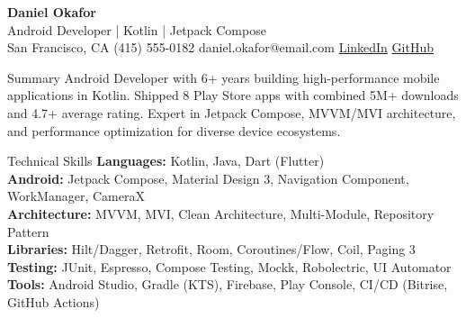 \documentclass[9.5pt,a4paper]{article}
\begin{document}
\begin{tcolorbox}[colback=accent,colframe=accent,arc=4pt,left=8pt,right=8pt,top=6pt,bottom=6pt]
{\color{white}\fontsize{18}{22}\selectfont\bfseries Daniel Okafor}\\[3pt]
{\color{white}\small Android Developer | Kotlin | Jetpack Compose}\\[3pt]
{\color{white}\small San Francisco, CA \quad\textbar\quad (415) 555-0182 \quad\textbar\quad daniel.okafor@email.com \quad\textbar\quad \href{https://linkedin.com/in/danielokafor}{\color{white}LinkedIn} \quad\textbar\quad \href{https://github.com/dokafor-android}{\color{white}GitHub}}
\end{tcolorbox}

\vspace{4pt}

\begin{card}{Summary}
Android Developer with 6+ years building high-performance mobile applications in Kotlin. Shipped 8 Play Store apps with combined 5M+ downloads and 4.7+ average rating. Expert in Jetpack Compose, MVVM/MVI architecture, and performance optimization for diverse device ecosystems.
\end{card}

\vspace{3pt}

\begin{card}{Technical Skills}
\textbf{Languages:} Kotlin, Java, Dart (Flutter)\\
\textbf{Android:} Jetpack Compose, Material Design 3, Navigation Component, WorkManager, CameraX\\
\textbf{Architecture:} MVVM, MVI, Clean Architecture, Multi-Module, Repository Pattern\\
\textbf{Libraries:} Hilt/Dagger, Retrofit, Room, Coroutines/Flow, Coil, Paging 3\\
\textbf{Testing:} JUnit, Espresso, Compose Testing, Mockk, Robolectric, UI Automator\\
\textbf{Tools:} Android Studio, Gradle (KTS), Firebase, Play Console, CI/CD (Bitrise, GitHub Actions)
\end{card}

\vspace{3pt}
\end{document}
